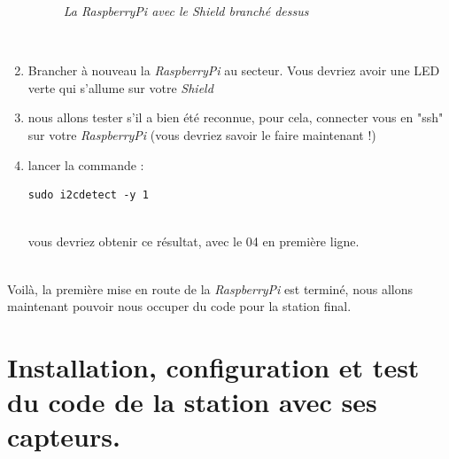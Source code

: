 \begin{enumerate}
	\begin{figure}[H]
	\begin{center}
	\end{center}
		\caption{ \textit{La RaspberryPi avec le Shield branché dessus}}
	\end{figure}\\
	
		\item Brancher à nouveau la \textit{RaspberryPi} au secteur. Vous devriez avoir une LED verte qui s'allume sur votre \textit{Shield}
		\item nous allons tester s'il a bien été reconnue, pour cela, connecter vous en "ssh" sur votre \textit{RaspberryPi} (vous devriez savoir le faire maintenant !)
		\item lancer la commande :
		\begin{lstlisting}[style=MyBashStyle]
		sudo i2cdetect -y 1
		\end{lstlisting}\\
	
vous devriez obtenir ce résultat, avec le 04 en première ligne. %

\end{enumerate}\\

Voilà, la première mise en route de la \textit{RaspberryPi} est terminé, nous allons maintenant pouvoir nous occuper du code pour la station final.

\section{Installation, configuration et test du code de la station avec ses capteurs.}\\

